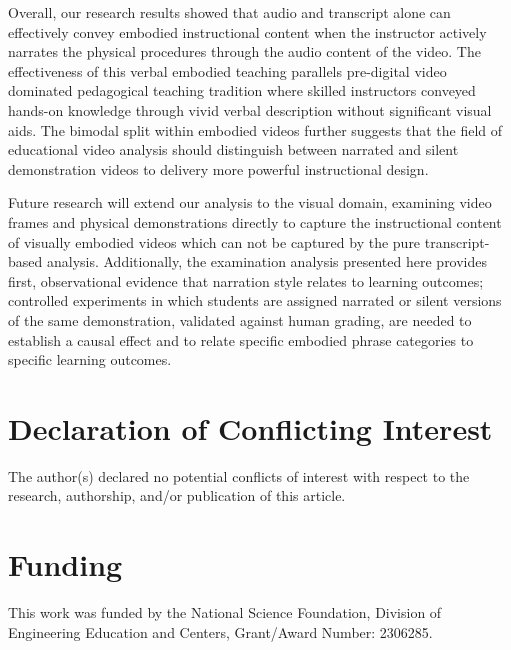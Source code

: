 \documentclass[fleqn,10pt]{JLA_article} %
\begin{document}
Overall, our research results showed that audio and transcript alone can effectively convey embodied instructional content when the instructor actively narrates the physical procedures through the audio content of the video. The effectiveness of this verbal embodied teaching parallels pre-digital video dominated pedagogical teaching tradition where skilled instructors conveyed hands-on knowledge through vivid verbal description without significant visual aids. The bimodal split within embodied videos further suggests that the field of educational video analysis should distinguish between narrated and silent demonstration videos to delivery more powerful instructional design.

Future research will extend our analysis to the visual domain, examining video frames and physical demonstrations directly to capture the instructional content of visually embodied videos which can not be captured by the pure transcript-based analysis. Additionally, the examination analysis presented here provides first, observational evidence that narration style relates to learning outcomes; controlled experiments in which students are assigned narrated or silent versions of the same demonstration, validated against human grading, are needed to establish a causal effect and to relate specific embodied phrase categories to specific learning outcomes.

\section*{Declaration of Conflicting Interest} %


The author(s) declared no potential conflicts of interest with respect to the research, authorship, and/or publication of this article.

\section*{Funding} %


This work was funded by the National Science Foundation, Division of Engineering Education and Centers, Grant/Award Number: 2306285.



\end{document}
